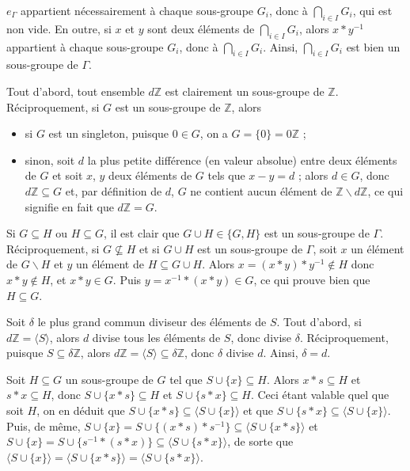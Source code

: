 \begin{sol}
$e_\Gamma$ appartient nécessairement à chaque sous-groupe $G_i$, donc à $\bigcap_{i \in I}G_i$, qui est non vide.
En outre, si $x$ et $y$ sont deux éléments de $\bigcap_{i \in I}G_i$, alors
$x \ast y^{-1}$ appartient à chaque sous-groupe $G_i$, donc à $\bigcap_{i \in I}G_i$.
Ainsi, $\bigcap_{i \in I}G_i$ est bien un sous-groupe de $\Gamma$.
\end{sol}

\begin{sol}
Tout d'abord, tout ensemble $d \mathbb{Z}$ est clairement un sous-groupe de $\mathbb{Z}$.
Réciproquement, si $G$ est un sous-groupe de $\mathbb{Z}$, alors
\begin{itemize}
\item si $G$ est un singleton, puisque $0 \in G$, on a $G = \{0\} = 0 \mathbb{Z}$ ;
\item sinon, soit $d$ la plus petite différence (en valeur absolue) entre deux éléments de $G$
et soit $x$, $y$ deux éléments de $G$ tels que $x - y = d$ ;
alors $d \in G$, donc $d \mathbb{Z} \subseteq G$ et, par définition de $d$,
$G$ ne contient aucun élément de $\mathbb{Z} \backslash d \mathbb{Z}$,
ce qui signifie en fait que $d \mathbb{Z} = G$.
\end{itemize}
\end{sol}

\begin{sol}
Si $G \subseteq H$ ou $H \subseteq G$, il est clair que $G \cup H \in \{G, H\}$ est un sous-groupe de $\Gamma$.
Réciproquement, si $G \not\subseteq H$ et si $G \cup H$ est un sous-groupe de $\Gamma$,
soit $x$ un élément de $G \backslash H$ et $y$ un élément de $H \subseteq G \cup H$.
Alors $x = (x \ast y) \ast y^{-1} \notin H$ donc $x \ast y \notin H$, et $x \ast y \in G$.
Puis $y = x^{-1} \ast (x \ast y) \in G$, ce qui prouve bien que $H \subseteq G$.
\end{sol}

\begin{sol}
Soit $\delta$ le plus grand commun diviseur des éléments de $S$.
Tout d'abord, si $d \mathbb{Z} = \langle S \rangle$, alors
$d$ divise tous les éléments de $S$, donc divise $\delta$.
Réciproquement, puisque $S \subseteq \delta \mathbb{Z}$, alors
$d \mathbb{Z} = \langle S \rangle \subseteq \delta \mathbb{Z}$, donc
$\delta$ divise $d$.
Ainsi, $\delta = d$.
\end{sol}

\begin{sol}
Soit $H \subseteq G$ un sous-groupe de $G$ tel que
$S \cup \{x\} \subseteq H$. Alors $x \ast s \subseteq H$ et $s \ast x \subseteq H$, donc
$S \cup \{x \ast s\} \subseteq H$ et $S \cup \{s \ast x\} \subseteq H$.
Ceci étant valable quel que soit $H$, on en déduit que
$S \cup \{x \ast s\} \subseteq \langle S \cup \{x\} \rangle$ et que
$S \cup \{s \ast x\} \subseteq \langle S \cup \{x\} \rangle$.
Puis, de même,
$S \cup \{x\}  = S \cup \{(x \ast s) \ast s^{-1}\}\subseteq \langle S \cup \{x \ast s\} \rangle$ et
$S \cup \{x\}  = S \cup \{s^{-1} \ast (s \ast x)\}\subseteq \langle S \cup \{s \ast x\} \rangle$, de sorte que
$\langle S \cup \{x\} \rangle = \langle S \cup \{x \ast s\} \rangle = \langle S \cup \{s \ast x\} \rangle$. 
\end{sol}

